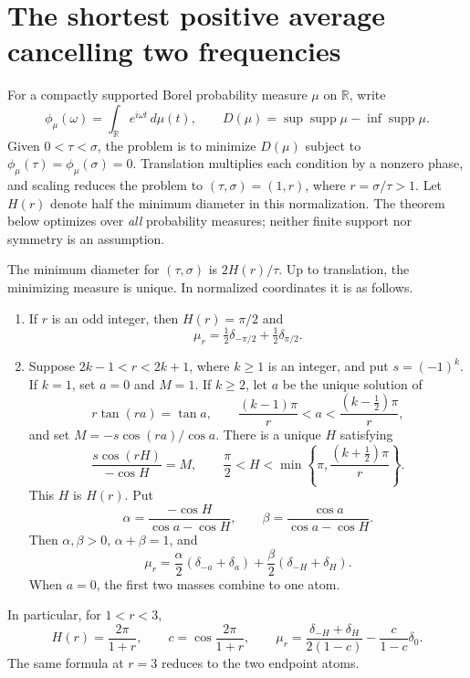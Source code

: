 \section{The shortest positive average cancelling two frequencies}
\label{sec:two-frequency}

For a compactly supported Borel probability measure $\mu$ on $\mathbb R$, write
\[
 \phi_\mu(\omega)=\int_{\mathbb R}e^{i\omega t}\,d\mu(t),\qquad
 D(\mu)=\sup\operatorname{supp}\mu-\inf\operatorname{supp}\mu.
\]
Given $0<\tau<\sigma$, the problem is to minimize $D(\mu)$ subject to
$\phi_\mu(\tau)=\phi_\mu(\sigma)=0$. Translation multiplies each condition by a
nonzero phase, and scaling reduces the problem to $(\tau,\sigma)=(1,r)$,
where $r=\sigma/\tau>1$. Let $H(r)$ denote half the minimum diameter in this
normalization. The theorem below optimizes over \emph{all} probability measures;
neither finite support nor symmetry is an assumption.

\begin{theorem}\label{thm:two-frequency}
The minimum diameter for $(\tau,\sigma)$ is $2H(r)/\tau$. Up to translation,
the minimizing measure is unique. In normalized coordinates it is as follows.
\begin{enumerate}
\item If $r$ is an odd integer, then $H(r)=\pi/2$ and
\[
 \mu_r=\tfrac12\delta_{-\pi/2}+\tfrac12\delta_{\pi/2}.
\]
\item Suppose $2k-1<r<2k+1$, where $k\ge1$ is an integer, and put
$s=(-1)^k$. If $k=1$, set $a=0$ and $M=1$. If $k\ge2$, let $a$ be the
unique solution of
\begin{equation}\label{eq:tangent}
 r\tan(ra)=\tan a,
 \qquad \frac{(k-1)\pi}{r}<a<\frac{(k-\tfrac12)\pi}{r},
\end{equation}
and set $M=-s\cos(ra)/\cos a$. There is a unique $H$ satisfying
\begin{equation}\label{eq:endpoint}
 \frac{s\cos(rH)}{-\cos H}=M,
 \qquad \frac\pi2<H<\min\left\{\pi,\frac{(k+\tfrac12)\pi}{r}\right\}.
\end{equation}
This $H$ is $H(r)$. Put
\[
 \alpha=\frac{-\cos H}{\cos a-\cos H},\qquad
 \beta=\frac{\cos a}{\cos a-\cos H}.
\]
Then $\alpha,\beta>0$, $\alpha+\beta=1$, and
\begin{equation}\label{eq:optimal-measure}
 \mu_r=\frac\alpha2(\delta_{-a}+\delta_a)
          +\frac\beta2(\delta_{-H}+\delta_H).
\end{equation}
When $a=0$, the first two masses combine to one atom.
\end{enumerate}
In particular, for $1<r<3$,
\begin{equation}\label{eq:low-ratio}
 H(r)=\frac{2\pi}{1+r},\qquad
 c=\cos\frac{2\pi}{1+r},\qquad
 \mu_r=\frac{\delta_{-H}+\delta_H}{2(1-c)}
             -\frac{c}{1-c}\delta_0.
\end{equation}
The same formula at $r=3$ reduces to the two endpoint atoms.
\end{theorem}


